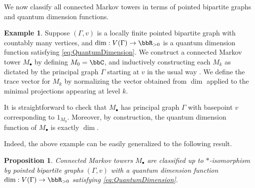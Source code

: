 \documentclass[11pt]{article}
\theoremstyle{plain}
\newtheorem{prop}[thm]{Proposition}
\theoremstyle{definition}
\newtheorem{ex}[thm]{Example}
\DeclareMathOperator{\tr}{tr}
\newcommand{\nn}[1]{\textcolor{red}{[[#1]]}}
\begin{document}
We now classify all connected Markov towers in terms of pointed bipartite graphs and quantum dimension functions.

\begin{ex}
Suppose $(\Gamma, v)$ is a locally finite pointed bipartite graph with countably many vertices, and $\dim : V(\Gamma) \to \bbR_{>0}$ is a quantum dimension function satisfying \eqref{eq:QuantumDimension}.
We construct a connected Markov tower $M_\bullet$ by defining $M_0 = \bbC$, and inductively constructing each $M_k$ as dictated by the principal graph $\Gamma$ starting at $v$ in the usual way \cite{MR999799,MR1473221}.
We define the trace vector for $M_k$ by normalizing the vector obtained from $\dim$ applied to the minimal projections appearing at level $k$.

It is straightforward to check that $M_\bullet$ has principal graph $\Gamma$ with basepoint $v$ corresponding to $1_{M_0}$.
Moreover, by construction, the quantum dimension function of $M_\bullet$ is exactly $\dim$.
\end{ex}

Indeed, the above example can be easily generalized to the following result.

\begin{prop}
\label{prop:ClassificationOfMarkovTowers}
Connected Markov towers $M_\bullet$ are classified up to $*$-isomorphism by pointed bipartite graphs $(\Gamma,v)$ with a quantum dimension function $\dim: V(\Gamma) \to \bbR_{>0}$ satisfying \eqref{eq:QuantumDimension}.
\end{prop}
%
%
\end{document}
